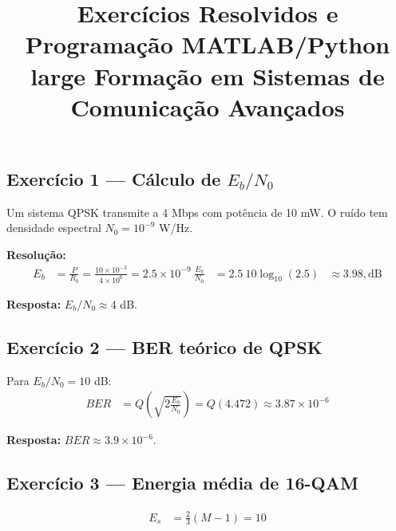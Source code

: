 \documentclass[12pt,a4paper]{article} \usepackage[utf8]{inputenc}
\begin{document}
\title{Exercícios Resolvidos e Programação MATLAB/Python\\large Formação em Sistemas de Comunicação Avançados} \author{} \date{} \maketitle

\tableofcontents \newpage


\subsection{Exercício 1 — Cálculo de $E_b/N_0$} Um sistema QPSK transmite a 4 Mbps com potência de 10 mW. O ruído tem densidade espectral $N_0 = 10^{-9}$ W/Hz.

\textbf{Resolução:} \begin{align*} E_b &= \frac{P}{R_b} = \frac{10 \times 10^{-3}}{4 \times 10^6} = 2.5 \times 10^{-9} \ \frac{E_b}{N_0} &= 2.5 \ 10\log_{10}(2.5) &\approx 3.98,\text{dB} \end{align*}

\textbf{Resposta:} $E_b/N_0 \approx 4$ dB.

\subsection{Exercício 2 — BER teórico de QPSK} Para $E_b/N_0 = 10$ dB: \begin{align*} BER &= Q\left(\sqrt{2\frac{E_b}{N_0}}\right) = Q(4.472) \approx 3.87 \times 10^{-6} \end{align*}

\textbf{Resposta:} $BER \approx 3.9 \times 10^{-6}$.


\subsection{Exercício 3 — Energia média de 16-QAM} \begin{align*} E_s &= \frac{2}{3}(M-1) = 10 \end{align*}
\end{document}
